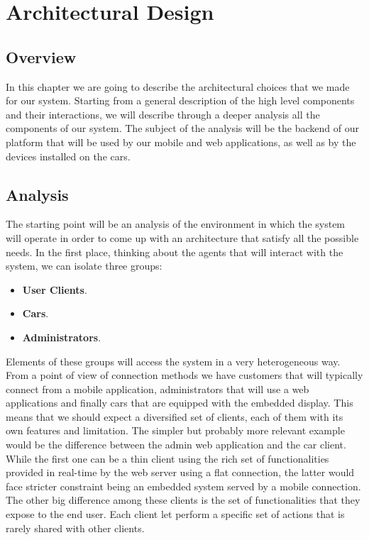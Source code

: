\pagebreak
\section{Architectural Design}
  
\subsection{Overview}
In this chapter we are going to describe the architectural choices that we made for our system. 
Starting from a general description of the high level components and their interactions,
we will describe through a deeper analysis all the components of our system.
The subject of the analysis will be the backend of our platform that will be used by
our mobile and web applications, as well as by the devices installed on the cars.

\subsection{Analysis}
The starting point will be an analysis of the environment in which the system will operate
in order to come up with an architecture that satisfy all the possible needs.
In the first place, thinking about the agents that will interact with the system,
we can isolate three groups:
\begin{itemize}
    \item \textbf{User Clients}.
    \item \textbf{Cars}.
    \item \textbf{Administrators}.
\end{itemize}
Elements of these groups will access the system in a very heterogeneous way. From
a point of view of connection methods we have customers that will typically connect
from a mobile application, administrators that will use a web applications and finally
cars that are equipped with the embedded display.
This means that we should expect a diversified set of clients, each of them with
its own features and limitation. The simpler but probably more relevant example 
would be the difference between the admin web application and the car client.
While the first one can be a thin client using the rich set of functionalities
provided in real-time by the web server using a flat connection, the latter would
face stricter constraint being an embedded system served by a mobile connection.
The other big difference among these clients is the set of functionalities that they
expose to the end user. Each client let perform a specific set of actions that is rarely
shared with other clients.

